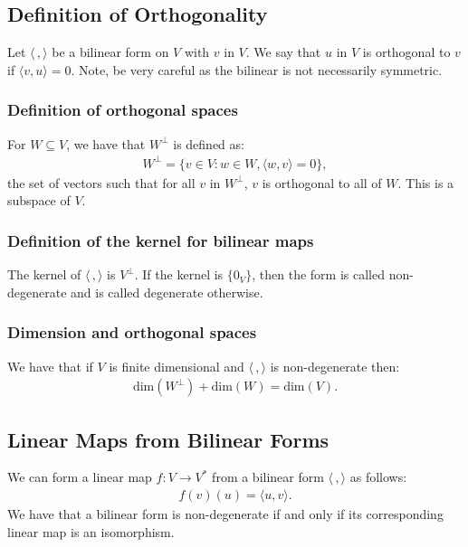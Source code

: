 \documentclass[a4paper, 12pt, twoside]{article}
\begin{document}
\subsection{Definition of Orthogonality}

Let $\langle \, , \rangle$ be a bilinear form on $V$ with $v$ in $V$. We say that $u$ in $V$ is 
orthogonal to $v$ if $\langle v, u \rangle = 0$. Note, be very careful as the bilinear is not
necessarily symmetric.

\subsubsection{Definition of orthogonal spaces}

For $W \subseteq V$, we have that $W^\perp$ is defined as: \begin{gather*}
  W^\perp = \{v \in V : w \in W, \langle w, v \rangle = 0\},
\end{gather*} the set of vectors such that for all $v$ in $W^\perp$, $v$ is orthogonal
to all of $W$. This is a subspace of $V$.

\subsubsection{Definition of the kernel for bilinear maps}

The kernel of $\langle \, , \rangle$ is $V^\perp$. If the kernel is $\{0_V\}$,
then the form is called non-degenerate and is called degenerate otherwise.

\subsubsection{Dimension and orthogonal spaces}

We have that if $V$ is finite dimensional and $\langle \, , \rangle$ is non-degenerate
then: \begin{gather*}
  \text{dim}(W^\perp) + \text{dim}(W) = \text{dim}(V).
\end{gather*}

\subsection{Linear Maps from Bilinear Forms}

We can form a linear map $f : V \to V^*$ from a bilinear form $\langle \, , \rangle$ 
as follows: \begin{gather*}
  f(v)(u) = \langle u, v \rangle.
\end{gather*} We have that a bilinear form is non-degenerate if and only if its corresponding
linear map is an isomorphism.
\end{document}
